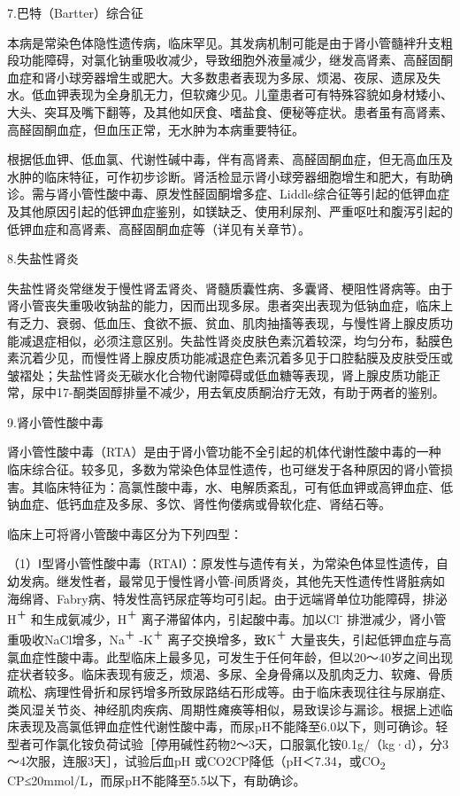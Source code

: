 \hypertarget{text00273.htmlux5cux23CHP35-2-2-2-2-5-7}{}
7.巴特（Bartter）综合征

本病是常染色体隐性遗传病，临床罕见。其发病机制可能是由于肾小管髓袢升支粗段功能障碍，对氯化钠重吸收减少，导致细胞外液量减少，继发高肾素、高醛固酮血症和肾小球旁器增生或肥大。大多数患者表现为多尿、烦渴、夜尿、遗尿及失水。低血钾表现为全身肌无力，但软瘫少见。儿童患者可有特殊容貌如身材矮小、大头、突耳及嘴下翻等，及其他如厌食、嗜盐食、便秘等症状。患者虽有高肾素、高醛固酮血症，但血压正常，无水肿为本病重要特征。

根据低血钾、低血氯、代谢性碱中毒，伴有高肾素、高醛固酮血症，但无高血压及水肿的临床特征，可作初步诊断。肾活检显示肾小球旁器细胞增生和肥大，有助确诊。需与肾小管性酸中毒、原发性醛固酮增多症、Liddle综合征等引起的低钾血症及其他原因引起的低钾血症鉴别，如镁缺乏、使用利尿剂、严重呕吐和腹泻引起的低钾血症和高肾素、高醛固酮血症等（详见有关章节）。

\hypertarget{text00273.htmlux5cux23CHP35-2-2-2-2-5-8}{}
8.失盐性肾炎

失盐性肾炎常继发于慢性肾盂肾炎、肾髓质囊性病、多囊肾、梗阻性肾病等。由于肾小管丧失重吸收钠盐的能力，因而出现多尿。患者突出表现为低钠血症，临床上有乏力、衰弱、低血压、食欲不振、贫血、肌肉抽搐等表现，与慢性肾上腺皮质功能减退症相似，必须注意区别。失盐性肾炎皮肤色素沉着较深，均匀分布，黏膜色素沉着少见，而慢性肾上腺皮质功能减退症色素沉着多见于口腔黏膜及皮肤受压或皱褶处；失盐性肾炎无碳水化合物代谢障碍或低血糖等表现，肾上腺皮质功能正常，尿中17-酮类固醇排量不减少，用去氧皮质酮治疗无效，有助于两者的鉴别。

\hypertarget{text00273.htmlux5cux23CHP35-2-2-2-2-5-9}{}
9.肾小管性酸中毒

肾小管性酸中毒（RTA）是由于肾小管功能不全引起的机体代谢性酸中毒的一种临床综合征。较多见，多数为常染色体显性遗传，也可继发于各种原因的肾小管损害。其临床特征为：高氯性酸中毒，水、电解质紊乱，可有低血钾或高钾血症、低钠血症、低钙血症及多尿、多饮、肾性佝偻病或骨软化症、肾结石等。

临床上可将肾小管酸中毒区分为下列四型：

（1）Ⅰ型肾小管性酸中毒（RTAⅠ）：原发性与遗传有关，为常染色体显性遗传，自幼发病。继发性者，最常见于慢性肾小管-间质肾炎，其他先天性遗传性肾脏病如海绵肾、Fabry病、特发性高钙尿症等均可引起。由于远端肾单位功能障碍，排泌H\textsuperscript{＋}
和生成氨减少，H\textsuperscript{＋}
离子滞留体内，引起酸中毒。加以Cl\textsuperscript{-}
排泄减少，肾小管重吸收NaCl增多，Na\textsuperscript{＋}
-K\textsuperscript{＋} 离子交换增多，致K\textsuperscript{＋}
大量丧失，引起低钾血症与高氯血症性酸中毒。此型临床上最多见，可发生于任何年龄，但以20～40岁之间出现症状者较多。临床表现有疲乏，烦渴、多尿、全身骨痛以及肌肉乏力、软瘫、骨质疏松、病理性骨折和尿钙增多所致尿路结石形成等。由于临床表现往往与尿崩症、类风湿关节炎、神经肌肉疾病、周期性瘫痪等相似，易致误诊与漏诊。根据上述临床表现及高氯低钾血症性代谢性酸中毒，而尿pH不能降至6.0以下，则可确诊。轻型者可作氯化铵负荷试验［停用碱性药物2～3天，口服氯化铵0.1g/（kg·d），分3～4次服，连服3天］，试验后血pH
或CO2CP降低（pH＜7.34，或CO\textsubscript{2}
CP≤20mmol/L，而尿pH不能降至5.5以下，有助确诊。

